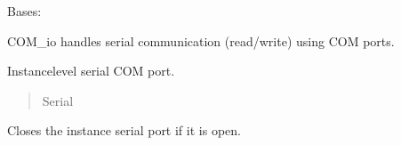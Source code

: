 \documentclass[letterpaper,10pt,english]{sphinxmanual}
\begin{document}
\begin{fulllineitems}
\label{\detokenize{Morelia.Devices.SerialPorts:Morelia.Devices.SerialPorts.SerialComm.PortIO}}
\pysigstartsignatures
{}
\pysigstopsignatures
\sphinxAtStartPar
Bases: 

\sphinxAtStartPar
COM\_io handles serial communication (read/write) using COM ports.

\begin{fulllineitems}
\label{\detokenize{Morelia.Devices.SerialPorts:Morelia.Devices.SerialPorts.SerialComm.PortIO.__serialInst}}
\pysigstartsignatures
{}
\pysigstopsignatures
\sphinxAtStartPar
Instance\sphinxhyphen{}level serial COM port.
\begin{quote}\begin{description}
\sphinxAtStartPar
Serial

\end{description}\end{quote}

\end{fulllineitems}


\begin{fulllineitems}
\label{\detokenize{Morelia.Devices.SerialPorts:Morelia.Devices.SerialPorts.SerialComm.PortIO.CloseSerialPort}}
\pysigstartsignatures
{}
\pysigstopsignatures
\sphinxAtStartPar
Closes the instance serial port if it is open.

\end{fulllineitems}


\end{fulllineitems}
\end{document}
